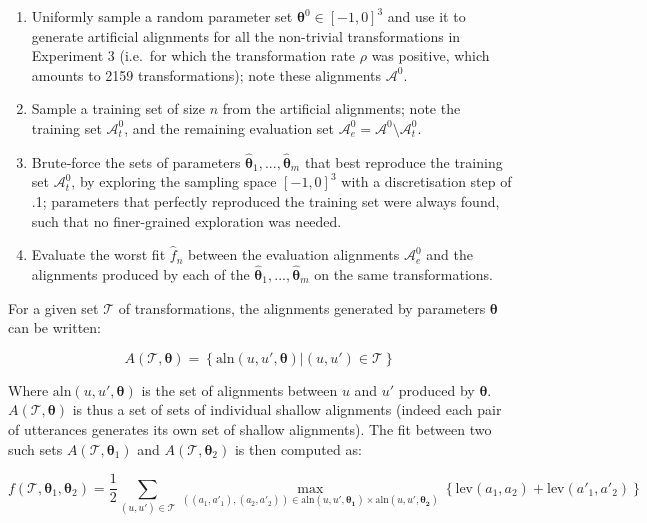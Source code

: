 \begin{enumerate}
\def\labelenumi{\arabic{enumi}.}
\item
  Uniformly sample a random parameter set
  \(\bm{\theta}^0 \in [-1, 0]^3\) and use it to generate artificial
  alignments for all the non-trivial transformations in Experiment 3
  (i.e.~for which the transformation rate \(\rho\) was positive, which
  amounts to 2159 transformations); note these alignments
  \(\mathcal{A}^0\).
\item
  Sample a training set of size \(n\) from the artificial alignments;
  note the training set \(\mathcal{A}_t^0\), and the remaining
  evaluation set
  \(\mathcal{A}_e^0 = \mathcal{A}^0 \setminus \mathcal{A}_t^0\).
\item
  Brute-force the sets of parameters
  \(\hat{\bm{\theta}}_1, ..., \hat{\bm{\theta}}_m\) that best reproduce
  the training set \(\mathcal{A}_t^0\), by exploring the sampling space
  \([-1, 0]^3\) with a discretisation step of .1; parameters that
  perfectly reproduced the training set were always found, such that no
  finer-grained exploration was needed.
\item
  Evaluate the worst fit \(\hat{f}_n\) between the evaluation alignments
  \(\mathcal{A}_e^0\) and the alignments produced by each of the
  \(\hat{\bm{\theta}}_1, ..., \hat{\bm{\theta}}_m\) on the same
  transformations.
\end{enumerate}

For a given set \(\mathcal{T}\) of transformations, the alignments
generated by parameters \(\bm{\theta}\) can be written:

\[A\left(\mathcal{T}, \bm{\theta}\right) = \left\{ \text{aln}(u, u', \bm{\theta}) | (u, u') \in \mathcal{T} \right\}\]

Where \(\text{aln}(u, u', \bm{\theta})\) is the set of alignments
between \(u\) and \(u'\) produced by \(\bm{\theta}\).
\(A\left(\mathcal{T}, \bm{\theta}\right)\) is thus a set of sets of
individual shallow alignments (indeed each pair of utterances generates
its own set of shallow alignments). The fit between two such sets
\(A\left(\mathcal{T}, \bm{\theta}_1\right)\) and
\(A\left(\mathcal{T}, \bm{\theta}_2\right)\) is then computed as:

\[
f(\mathcal{T}, \bm{\theta}_1, \bm{\theta}_2) =
  \frac{1}{2}
  \sum_{(u, u') \in \mathcal{T}}
    \max_{((a_1, a'_1), (a_2, a'_2))
      \in \text{aln}(u, u', \bm{\theta_1}) \times \text{aln}(u, u', \bm{\theta_2})}
    \left\{
      \text{lev}(a_1, a_2) + \text{lev}(a'_1, a'_2)
    \right\}
\]

